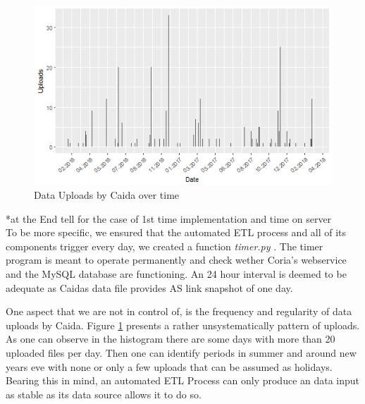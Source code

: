 \documentclass[conference, 11pt]{IEEEtran}
\begin{document}
\vspace{0.5cm}
\begin{figure}[htbp]
\centerline{\includegraphics[scale=0.5]{Graphics/uploadFrequency.png}}
\caption{Data Uploads by Caida over time}
\label{fig:UploadOverTime}
\end{figure}
\vspace{0.5cm}

 
*at the End tell for the case of 1st time implementation and time on server \\


To be more specific, we ensured that the automated ETL process and all of its components trigger every day, we created a function \textit{timer.py} \cite{time.py}. The timer program is meant to operate permanently and check wether Coria's webservice and the MySQL database are functioning. An 24 hour interval is deemed to be adequate as Caida\textsc{}s data file provides AS link snapshot of one day. %

One aspect that we are not in control of, is the frequency and regularity of data uploads by Caida. Figure \ref{fig:UploadOverTime} presents a rather unsystematically pattern of uploads. As one can observe in the histogram there are some days with more than 20 uploaded files per day. Then one can identify periods in summer and around new years eve with none or only a few uploads that can be assumed as holidays. Bearing this in mind, an automated ETL Process can only produce an data input as stable as its data source allows it to do so. 
\end{document}
